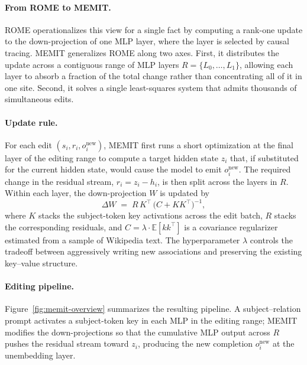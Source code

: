 \documentclass[11pt]{article}
\begin{document}
\paragraph{From ROME to MEMIT.}
ROME operationalizes this view for a single fact by computing a rank-one update to the down-projection of one MLP layer, where the layer is selected by causal tracing. MEMIT generalizes ROME along two axes. First, it distributes the update across a contiguous range of MLP layers $R = \{L_0, \dots, L_1\}$, allowing each layer to absorb a fraction of the total change rather than concentrating all of it in one site. Second, it solves a single least-squares system that admits thousands of simultaneous edits.

\paragraph{Update rule.}
For each edit $(s_i, r_i, o^{\text{new}}_i)$, MEMIT first runs a short optimization at the final layer of the editing range to compute a target hidden state $z_i$ that, if substituted for the current hidden state, would cause the model to emit $o^{\text{new}}_i$. The required change in the residual stream, $r_i = z_i - h_i$, is then split across the layers in $R$. Within each layer, the down-projection $W$ is updated by
\begin{equation}
\Delta W \;=\; R\, K^{\top}\, \bigl(C + K K^{\top}\bigr)^{-1},
\label{eq:memit}
\end{equation}
where $K$ stacks the subject-token key activations across the edit batch, $R$ stacks the corresponding residuals, and $C = \lambda \cdot \mathbb{E}[k k^{\top}]$ is a covariance regularizer estimated from a sample of Wikipedia text. The hyperparameter $\lambda$ controls the tradeoff between aggressively writing new associations and preserving the existing key--value structure.

\paragraph{Editing pipeline.}
Figure~\ref{fig:memit-overview} summarizes the resulting pipeline. A subject--relation prompt activates a subject-token key in each MLP in the editing range; MEMIT modifies the down-projections so that the cumulative MLP output across $R$ pushes the residual stream toward $z_i$, producing the new completion $o^{\text{new}}_i$ at the unembedding layer.
\end{document}
